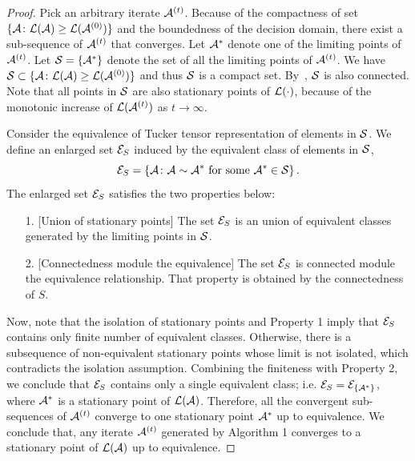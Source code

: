 \documentclass[12pt]{article}
\theoremstyle{definition}
\theoremstyle{definition}
\begin{document}
\begin{proof}
Pick an arbitrary iterate $\mathcal{A}^{(t)}$.  Because of the compactness of set $\{\mathcal{A}\colon  \mathcal{L}(\mathcal{A}) \geq \mathcal{L}(\mathcal{A}^{(0)}) \}$ and the boundedness of the decision domain, there exist a sub-sequence of $\mathcal{A}^{(t)}$ that converges. Let $\mathcal{A}^*$ denote one of the limiting points of $\mathcal{A}^{(t)}$. Let $\mathcal{S} = \{\mathcal{A}^*\}$ denote the set of all the limiting points of $\mathcal{A}^{(t)}$. We have $\mathcal{S} \subset \{\mathcal{A}\colon  \mathcal{L}(\mathcal{A}) \geq \mathcal{L}(\mathcal{A}^{(0)}) \}$ and thus $\mathcal{S}$ is a compact set. By~\citet[Propositions 8.2.1 and 13.4.2]{Lange:2012:NAS:2432073}, $\mathcal{S}$ is also connected. Note that all points in $\mathcal{S}$ are also stationary points of $\mathcal{L}(\cdot)$, because of the monotonic increase of $\mathcal{L}(\mathcal{A}^{(t)})$ as $t \rightarrow \infty$. 
 
 
 Consider the equivalence of Tucker tensor representation of elements in $\mathcal{S}$. We define an enlarged set $\mathcal{E}_S$ induced by the equivalent class of elements in $\mathcal{S}$,
\begin{equation}
 \mathcal{E}_S = \left\{\mathcal{A}\colon \mathcal{A}\sim \mathcal{A}^* \text{ for some }\mathcal{A}^* \in \mathcal{S}\right\}.
\end{equation}
The enlarged set $\mathcal{E}_S$ satisfies the two properties below:
 \begin{enumerate}
\item [1.] [Union of stationary points] The set $\mathcal{E}_S$ is an union of equivalent  classes generated by the limiting points in $\mathcal{S}$.
\item [2.] [Connectedness module the equivalence]  The set $\mathcal{E}_S$ is connected module the equivalence relationship. That property is obtained by the connectedness of $S$.
 \end{enumerate}
Now, note that the isolation of stationary points and Property 1 imply that $\mathcal{E}_S$ contains only finite number of equivalent classes. Otherwise, there is a subsequence of non-equivalent stationary points whose limit is not isolated, which contradicts the isolation assumption. Combining the finiteness with Property 2, we conclude that $\mathcal{E}_S$ contains only a single equivalent class; i.e. $\mathcal{E}_S = \mathcal{E}_{\{\mathcal{A}^*\}}$, where $\mathcal{A}^*$ is a stationary point of $\mathcal{L}(\mathcal{A})$. Therefore, all the convergent sub-sequences of $\mathcal{A}^{(t)}$ converge to one stationary point $\mathcal{A}^*$ up to equivalence. We conclude that, any iterate $\mathcal{A}^{(t)}$ generated by Algorithm 1 converges to a stationary point of $\mathcal{L}(\mathcal{A})$ up to equivalence.
 \end{proof}
 
\end{document}
